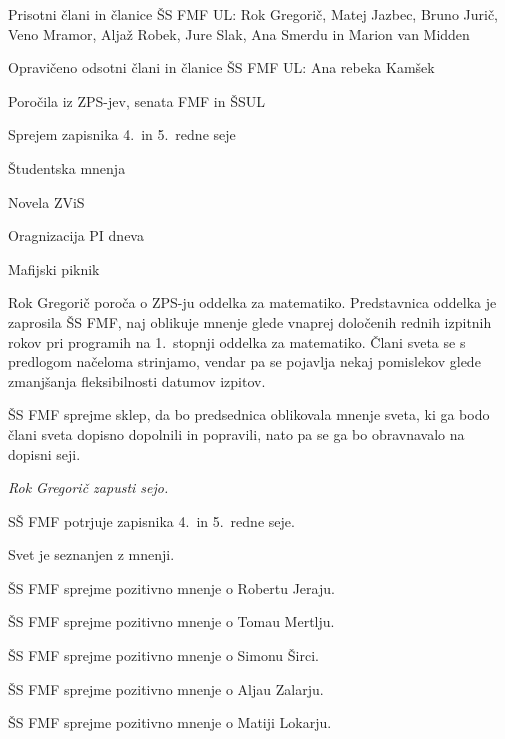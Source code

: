 \documentclass{seja}
\begin{document}
Prisotni člani in članice ŠS FMF UL: Rok Gregorič, Matej Jazbec, Bruno Jurič,
Veno Mramor, Aljaž Robek, Jure Slak, Ana Smerdu in Marion van Midden

Opravičeno odsotni člani in članice ŠS FMF UL: Ana rebeka Kamšek

\begin{red*}
\item Poročila iz ZPS-jev, senata FMF in ŠSUL
\item Sprejem zapisnika 4.~in 5.~redne seje
\item Študentska mnenja
\item Novela ZViS
\item Oragnizacija PI dneva
\item Mafijski piknik
\end{red*}

\begin{ad}
\item  Rok Gregorič poroča o ZPS-ju oddelka za matematiko. Predstavnica oddelka je
zaprosila ŠS FMF, naj oblikuje mnenje glede vnaprej določenih rednih izpitnih rokov
pri programih na 1.~stopnji oddelka za matematiko. Člani sveta se s predlogom načeloma
strinjamo, vendar pa se pojavlja nekaj pomislekov glede zmanjšanja fleksibilnosti
datumov izpitov.

\begin{sklep*}
ŠS FMF sprejme sklep, da bo predsednica oblikovala mnenje sveta, ki ga bodo člani sveta
dopisno dopolnili in popravili, nato pa se ga bo obravnavalo na dopisni seji.
\end{sklep*}

\textit{Rok Gregorič zapusti sejo.}

\item
\begin{sklep*}
SŠ FMF potrjuje zapisnika 4.~in 5.~redne seje.
\end{sklep*}

\item Svet je seznanjen z mnenji.
\begin{sklep*}
ŠS FMF sprejme pozitivno mnenje o Robertu Jeraju.
\end{sklep*}
\begin{sklep*}
ŠS FMF sprejme pozitivno mnenje o Tomau Mertlju.
\end{sklep*}
\begin{sklep*}
ŠS FMF sprejme pozitivno mnenje o Simonu Širci.
\end{sklep*}
\begin{sklep*}
ŠS FMF sprejme pozitivno mnenje o Aljau Zalarju.
\end{sklep*}
\begin{sklep*}
ŠS FMF sprejme pozitivno mnenje o Matiji Lokarju.
\end{sklep*}


\end{ad}
\end{document}
